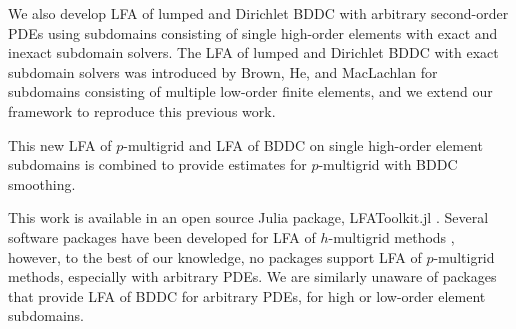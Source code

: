 We also develop LFA of lumped and Dirichlet BDDC with arbitrary second-order PDEs using subdomains consisting of single high-order elements with exact and inexact subdomain solvers.
The LFA of lumped and Dirichlet BDDC with exact subdomain solvers was introduced by Brown, He, and MacLachlan \cite{brown2019local} for subdomains consisting of multiple low-order finite elements, and we extend our framework to reproduce this previous work.

This new LFA of $p$-multigrid and LFA of BDDC on single high-order element subdomains is combined to provide estimates for $p$-multigrid with BDDC smoothing.

This work is available in an open source Julia package, LFAToolkit.jl \cite{thompson2021toolkit}.
Several software packages have been developed for LFA of $h$-multigrid methods \cite{rittich2018extending,kahl2020automated,wienands2004practical}, however, to the best of our knowledge, no packages support LFA of $p$-multigrid methods, especially with arbitrary PDEs.
We are similarly unaware of packages that provide LFA of BDDC for arbitrary PDEs, for high or low-order element subdomains.